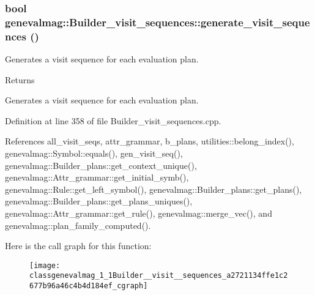 \hypertarget{classgenevalmag_1_1Builder__visit__sequences_a2721134ffe1c2677b96a46c4b4d184ef}{
\subsubsection[{generate\_\-visit\_\-sequences}]{\setlength{\rightskip}{0pt plus 5cm}bool genevalmag::Builder\_\-visit\_\-sequences::generate\_\-visit\_\-sequences ()}}
\label{classgenevalmag_1_1Builder__visit__sequences_a2721134ffe1c2677b96a46c4b4d184ef}
Generates a visit sequence for each evaluation plan. \begin{DoxyReturn}{Returns}

\end{DoxyReturn}
Generates a visit sequence for each evaluation plan. 

Definition at line 358 of file Builder\_\-visit\_\-sequences.cpp.



References all\_\-visit\_\-seqs, attr\_\-grammar, b\_\-plans, utilities::belong\_\-index(), genevalmag::Symbol::equals(), gen\_\-visit\_\-seq(), genevalmag::Builder\_\-plans::get\_\-context\_\-unique(), genevalmag::Attr\_\-grammar::get\_\-initial\_\-symb(), genevalmag::Rule::get\_\-left\_\-symbol(), genevalmag::Builder\_\-plans::get\_\-plans(), genevalmag::Builder\_\-plans::get\_\-plans\_\-uniques(), genevalmag::Attr\_\-grammar::get\_\-rule(), genevalmag::merge\_\-vec(), and genevalmag::plan\_\-family\_\-computed().



Here is the call graph for this function:\nopagebreak
\begin{figure}[H]
\begin{center}
\leavevmode
\texttt{[image: classgenevalmag\_1\_1Builder\_\_visit\_\_sequences\_a2721134ffe1c2677b96a46c4b4d184ef\_cgraph]}
\end{center}
\end{figure}


